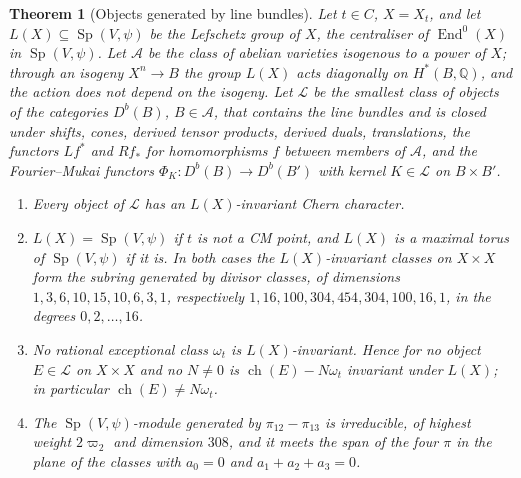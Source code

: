\documentclass[11pt,reqno]{amsart}
\theoremstyle{plain}
\newtheorem{theorem}{Theorem}[section]
\theoremstyle{definition}
\theoremstyle{remark}
\newcommand{\QQ}{\mathbb{Q}}
\DeclareMathOperator{\ch}{ch}
\DeclareMathOperator{\End}{End}
\DeclareMathOperator{\Sp}{Sp}
\begin{document}
\begin{theorem}[Objects generated by line bundles]\label{thm:lefschetzclosure}
Let $t\in C$, $X=X_{t}$, and let $L(X)\subseteq\Sp(V,\psi)$ be the Lefschetz
group of $X$, the centraliser of $\End^{0}(X)$ in $\Sp(V,\psi)$. Let
$\mathcal{A}$ be the class of abelian varieties isogenous to a power of $X$;
through an isogeny $X^{n}\to B$ the group $L(X)$ acts diagonally on
$H^{*}(B,\QQ)$, and the action does not depend on the isogeny. Let
$\mathcal{L}$ be the smallest class of objects of the categories
$D^{b}(B)$, $B\in\mathcal{A}$, that contains the line bundles and is closed
under shifts, cones, derived tensor products, derived duals, translations,
the functors $Lf^{*}$ and $Rf_{*}$ for homomorphisms $f$ between members of
$\mathcal{A}$, and the Fourier--Mukai functors $\Phi_{K}\colon D^{b}(B)\to
D^{b}(B')$ with kernel $K\in\mathcal{L}$ on $B\times B'$.
\begin{enumerate}[label=\textup{(\roman*)},leftmargin=2.6em,itemsep=2pt]
\item Every object of $\mathcal{L}$ has an $L(X)$-invariant Chern character.
\item $L(X)=\Sp(V,\psi)$ if $t$ is not a CM point, and $L(X)$ is a maximal
  torus of $\Sp(V,\psi)$ if it is. In both cases the $L(X)$-invariant classes
  on $X\times X$ form the subring generated by divisor classes, of dimensions
  $1,3,6,10,15,10,6,3,1$, respectively $1,16,100,304,454,304,100,16,1$, in
  the degrees $0,2,\dots,16$.
\item No rational exceptional class $\omega_{t}$ is $L(X)$-invariant. Hence
  for no object $E\in\mathcal{L}$ on $X\times X$ and no $N\ne0$ is
  $\ch(E)-N\omega_{t}$ invariant under $L(X)$; in particular
  $\ch(E)\ne N\omega_{t}$.
\item The $\Sp(V,\psi)$-module generated by $\pi_{12}-\pi_{13}$ is
  irreducible, of highest weight $2\varpi_{2}$ and dimension $308$, and it
  meets the span of the four $\pi$ in the plane of the classes with
  $a_{0}=0$ and $a_{1}+a_{2}+a_{3}=0$.
\end{enumerate}
\end{theorem}
\end{document}
